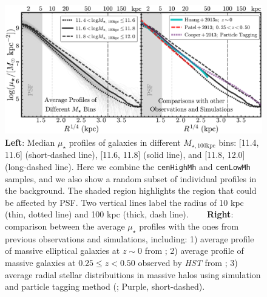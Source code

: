 \documentclass{emulateapj}
\def\rbcg{\texttt{cenHighMh}}
\def\nbcg{\texttt{cenLowMh}}
\def\mtot{{$M_{\star,100\mathrm{kpc}}$}}
\def\mden{{$\mu_{\star}$}}
\begin{document}
\begin{CJK*}{UTF8}{gbsn}

  \begin{figure}[bt!]
      \centering 
      \includegraphics[width=\textwidth]{fig/average_mass_profiles_fsps1_A}
      \caption{
      	\textbf{Left}: Median \mden{} profiles of galaxies in different \mtot{} bins:
      	[11.4, 11.6] (short-dashed line), [11.6, 11.8] (solid line), and 
      	[11.8, 12.0] (long-dashed line). 
      	Here we combine the \rbcg{} and \nbcg{} samples, and we also show a random subset 
      	of individual profiles in the background.
      	The shaded region highlights the region that could be affected by PSF.
        Two vertical lines label the radius of 10 kpc (thin, dotted line) and
        100 kpc (thick, dash line). ~~~ 
        \textbf{Right}: comparison between the average \mden{} profiles with the ones 
        from previous observations and simulations, including: 
        1) average profile of massive elliptical galaxies at $z\sim 0$ from 
        \citet[][Cyan, solid]{Huang2013a}; 
        2) average profile of massive galaxies at $0.25 \leq z < 0.50$ observed by 
        \textit{HST} from \citet[][Red, long-dashed]{Patel2013} ;
        3) average radial stellar distribuitions in massive halos using simulation and 
        particle tagging method (\citealt{Cooper13}; Purple, short-dashed).}
      \label{fig:avg_prof}
  \end{figure}


\end{CJK*}
\end{document}
